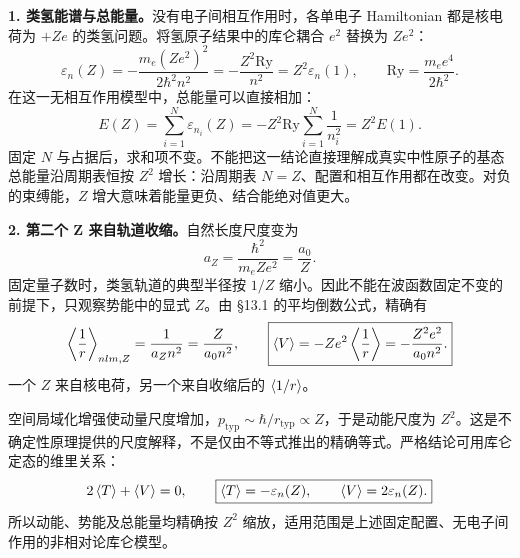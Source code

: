\begin{checkedsolution}
\textbf{1. 类氢能谱与总能量。}没有电子间相互作用时，各单电子 Hamiltonian 都是核电荷为 $+Ze$ 的类氢问题。将氢原子结果中的库仑耦合 $e^2$ 替换为 $Ze^2$：
\begin{equation}
  \boxed{\varepsilon_n(Z)=-\frac{m_e(Ze^2)^2}{2\hbar^2n^2}
      =-\frac{Z^2\mathrm{Ry}}{n^2}=Z^2\varepsilon_n(1),
      \qquad \mathrm{Ry}=\frac{m_e e^4}{2\hbar^2}.}
\end{equation}
在这一无相互作用模型中，总能量可以直接相加：
\begin{equation}
  \boxed{E(Z)=\sum_{i=1}^N\varepsilon_{n_i}(Z)
      =-Z^2\mathrm{Ry}\sum_{i=1}^N\frac1{n_i^2}=Z^2E(1).}
\end{equation}
固定 $N$ 与占据后，求和项不变。不能把这一结论直接理解成真实中性原子的基态总能量沿周期表恒按 $Z^2$ 增长：沿周期表 $N=Z$、配置和相互作用都在改变。对负的束缚能，$Z$ 增大意味着能量更负、结合能绝对值更大。

\textbf{2. 第二个 Z 来自轨道收缩。}自然长度尺度变为
\begin{equation}
  \boxed{a_Z=\frac{\hbar^2}{m_eZe^2}=\frac{a_0}{Z}.}
\end{equation}
固定量子数时，类氢轨道的典型半径按 $1/Z$ 缩小。因此不能在波函数固定不变的前提下，只观察势能中的显式 $Z$。由 \S 13.1 的平均倒数公式，精确有
\begin{equation}
  \left\langle \frac1r \right\rangle_{nlm,Z}=\frac1{a_Zn^2}
     =\frac{Z}{a_0n^2},\qquad
  \boxed{\left\langle V \right\rangle=-Ze^2\left\langle \frac1r \right\rangle
       =-\frac{Z^2e^2}{a_0n^2}.}
\end{equation}
一个 $Z$ 来自核电荷，另一个来自收缩后的 $\left\langle 1/r \right\rangle$。

空间局域化增强使动量尺度增加，$p_{\mathrm{typ}}\sim\hbar/r_{\mathrm{typ}}\propto Z$，于是动能尺度为 $Z^2$。这是不确定性原理提供的尺度解释，不是仅由不等式推出的精确等式。严格结论可用库仑定态的维里关系：
\begin{equation}
  2\left\langle T \right\rangle+\left\langle V \right\rangle=0,\qquad
  \boxed{\left\langle T \right\rangle=-\varepsilon_n(Z),\qquad
         \left\langle V \right\rangle=2\varepsilon_n(Z).}
\end{equation}
所以动能、势能及总能量均精确按 $Z^2$ 缩放，适用范围是上述固定配置、无电子间作用的非相对论库仑模型。
\end{checkedsolution}
